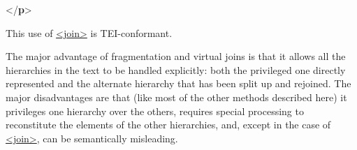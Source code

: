 \begin{shaded}
\mbox{}\newline 
{</\textbf{p}>}\end{shaded}\egroup\par \par
This use of \hyperref[TEI.join]{<join>} is TEI-conformant.\par
The major advantage of fragmentation and virtual joins is that it allows all the hierarchies in the text to be handled explicitly: both the privileged one directly represented and the alternate hierarchy that has been split up and rejoined. The major disadvantages are that (like most of the other methods described here) it privileges one hierarchy over the others, requires special processing to reconstitute the elements of the other hierarchies, and, except in the case of \hyperref[TEI.join]{<join>}, can be semantically misleading.
